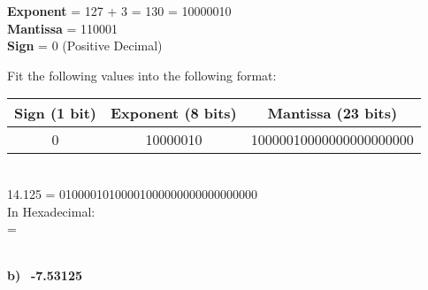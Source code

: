 \documentclass[12pt]{article}
\begin{document}
	\noindent \textbf{Exponent} = 127 + 3 = 130 = 10000010  \\
	\textbf{Mantissa} = 110001  \\
	\textbf{Sign} = 0 (Positive Decimal)  \\

	\begin{center}
		Fit the following values into the following format: \vspace{0.25cm} \\
		
		\begin{tabular}{ |c|c|c| }
			\hline
			Sign (1 bit) & Exponent (8 bits) & Mantissa (23 bits) \\
			\hline
			0            & 10000010          & 10000010000000000000000  \\
			\hline
		\end{tabular} \vspace{1cm} \\
		
	
		14.125 = 01000010100001000000000000000000  \vspace{0.5cm} \\
		
		In Hexadecimal: \\
		=  \\
		  \vspace{2cm} \\
	
	\end{center}
	
	
	
	
	
	
	
	
	
	
	\textbf{b)} \ \textbf{-7.53125}
	
\end{document}
